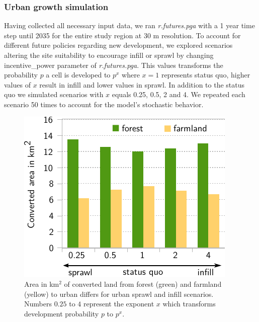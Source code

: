 \documentclass{isprs}
\begin{document}
\subsubsection{Urban growth simulation}
Having collected all necessary input data, we ran 
\emph{r.futures.pga} with a 1 year time step until 2035 for the entire study region at 30 m resolution.
To account for different future policies regarding new development, we explored
scenarios altering the site suitability to encourage infill or sprawl by changing
incentive\_power parameter of \emph{r.futures.pga}. This values transforms
the probability $p$ a cell is developed to $p^x$ where $x = 1$ represents status quo,
higher values of $x$ result in infill and lower values in sprawl.
In addition to the status quo we simulated scenarios with $x$ equals 0.25, 0.5, 2 and 4.
We repeated each scenario 50 times to account for the model's stochastic behavior.

\begin{figure}[!ht]
 \centering
 \includegraphics[width=0.9\columnwidth]{./figures/converted_land_new.pdf}
 \caption{Area in km$^2$ of converted land from forest (green) and farmland (yellow) to urban
 differs for urban sprawl and infill scenarios. Numbers $0.25$ to $4$ represent the exponent $x$ which
 transforms development probability $p$ to $p^x$.}
 \label{fig:results_plot}
\end{figure}
\end{document}
